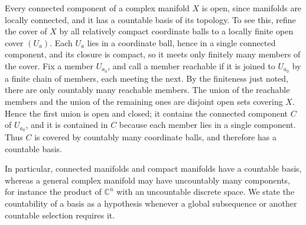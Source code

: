 Every connected component of a complex manifold $X$ is open, since manifolds are locally connected, and it has a countable basis of its topology. To see this, refine the cover of $X$ by all relatively compact coordinate balls to a locally finite open cover $(U_a)$. Each $U_a$ lies in a coordinate ball, hence in a single connected component, and its closure is compact, so it meets only finitely many members of the cover. Fix a member $U_{a_0}$, and call a member reachable if it is joined to $U_{a_0}$ by a finite chain of members, each meeting the next. By the finiteness just noted, there are only countably many reachable members. The union of the reachable members and the union of the remaining ones are disjoint open sets covering $X$. Hence the first union is open and closed; it contains the connected component $C$ of $U_{a_0}$, and it is contained in $C$ because each member lies in a single component. Thus $C$ is covered by countably many coordinate balls, and therefore has a countable basis.

In particular, connected manifolds and compact manifolds have a countable basis, whereas a general complex manifold may have uncountably many components, for instance the product of $\mathbb C^n$ with an uncountable discrete space. We state the countability of a basis as a hypothesis whenever a global subsequence or another countable selection requires it.

